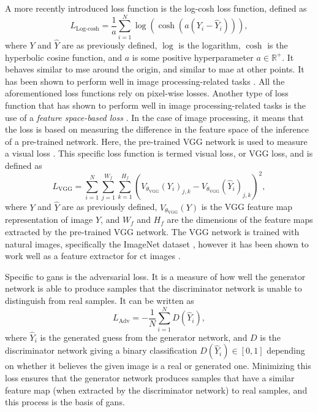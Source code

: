 A more recently introduced loss function is the log-cosh loss function, defined as \cite{chen2019log}
\begin{equation}
    \label{eq:losslogcosh}
    L_{\text{Log-cosh}} = \frac{1}{a} \sum_{i=1}^N \log ( \cosh ( a ( Y_i - \hat{Y}_i))),
\end{equation}
where $Y$ and $\hat{Y}$ are as previously defined, $\log$ is the logarithm, $\cosh$ is the hyperbolic cosine function, and $a$ is some positive hyperparameter $a \in \mathbb{R}^+$. It behaves similar to \gls{mse} around the origin, and similar to \gls{mae} at other points. It has been shown to perform well in image processing-related tasks \cite{7797130}.
All the aforementioned loss functions rely on pixel-wise losses. Another type of loss function that has shown to perform well in image processing-related tasks is the use of a \textit{feature space-based loss} \cite{vggloss}. In the case of image processing, it means that the loss is based on measuring the difference in the feature space of the inference of a pre-trained network. Here, the pre-trained VGG network is used to measure a visual loss \cite{simonyan2015deep}. This specific loss function is termed visual loss, or VGG loss, and is defined as \cite{vggloss,liu2020tomogan}
\begin{equation}
    \label{eq:lossvgg}
    L_{\text{VGG}} = \sum_{i=1}^{N} \sum_{j=1}^{W_f} \sum_{k=1}^{H_f} \left(V_{\theta_{\text{VGG}}} (Y_i)_{j,k} - V_{\theta_{\text{VGG}}} (\hat{Y}_i)_{j,k} \right)^2,
\end{equation}
where $Y$ and $\hat{Y}$ are as previously defined, $V_{\theta_{\text{VGG}}}(Y)$ is the VGG feature map representation of image $Y$, and $W_f$ and $H_f$ are the dimensions of the feature maps extracted by the pre-trained VGG network. The VGG network is trained with natural images, specifically the ImageNet dataset \cite{deng2009imagenet}, however it has been shown to work well as a feature extractor for \gls{ct} images \cite{8340157}. 

Specific to \gls{gan}s is the adversarial loss. It is a measure of how well the generator network is able to produce samples that the discriminator network is unable to distinguish from real samples. It can be written as \cite{liu2020tomogan}
\begin{equation}
    \label{eq:lossadv}
    L_{\text{Adv}} = -\frac{1}{N} \sum_{i=1}^{N} D\left(  \hat{Y}_i \right),
\end{equation}
where $\hat{Y}_i$ is the generated guess from the generator network, and $D$ is the discriminator network giving a binary classification $D\left(\hat{Y}_i \right) \in [0,1]$ depending on whether it believes the given image is a real or generated one. Minimizing this loss ensures that the generator network produces samples that have a similar feature map (when extracted by the discriminator network) to real samples, and this process is the basis of \gls{gan}s. 


